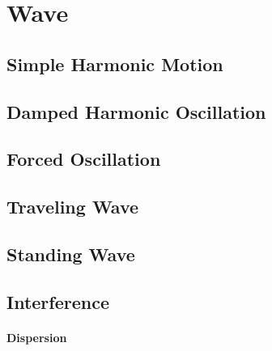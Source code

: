\documentclass[10pt]{report}
\begin{document}
\chapter*{Wave}

\section*{Simple Harmonic Motion}
\clearpage

\section*{Damped Harmonic Oscillation}
\clearpage

\section*{Forced Oscillation}
\clearpage

\section*{Traveling Wave}
\clearpage
\clearpage

\section*{Standing Wave}
\clearpage

\section*{Interference}
\clearpage
\clearpage

\subsubsection*{Dispersion}
\clearpage

\printbibliography
\end{document}
